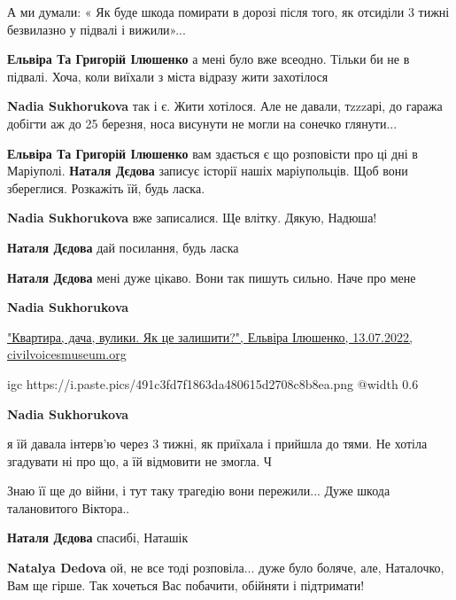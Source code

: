 
А ми думали: « Як буде шкода помирати в дорозі після того, як отсиділи 3 тижні
безвилазно у підвалі і вижили»...

\begin{itemize} %
\textbf{Ельвіра Та Григорій Ілюшенко} а мені було вже всеодно. Тільки би не в підвалі. Хоча, коли виїхали з міста відразу жити захотілося

\textbf{Nadia Sukhorukova} так і є. Жити хотілося. Але не давали, тzzzарі, до гаража добігти аж до 25 березня, носа висунути не могли на сонечко глянути...

\textbf{Ельвіра Та Григорій Ілюшенко} вам здається є що розповісти про ці дні в Маріуполі. \textbf{Наталя Дєдова} записує історії нашіх маріупольців. Щоб вони збереглися. Розкажіть їй, будь ласка.

\textbf{Nadia Sukhorukova} вже записалися. Ще влітку. Дякую, Надюша!

\textbf{Наталя Дєдова} дай посилання, будь ласка

\textbf{Наталя Дєдова} мені дуже цікаво. Вони так пишуть сильно. Наче про мене

\textbf{Nadia Sukhorukova}

\href{https://civilvoicesmuseum.org/stories/%22kvartira-dacha-uliki.-kak-eto-brosit%22}{%
"Квартира, дача, вулики. Як це залишити?", Ельвіра Ілюшенко, 13.07.2022, civilvoicesmuseum.org%
}

\ifcmt
  igc https://i.paste.pics/491c3fd7f1863da480615d2708c8b8ea.png
	@width 0.6
\fi

\textbf{Nadia Sukhorukova} 

я їй давала інтерв'ю через 3 тижні, як приїхала і прийшла до тями. Не хотіла
згадувати ні про що, а їй відмовити не змогла. Ч

Знаю її ще до війни, і тут таку трагедію вони пережили... Дуже шкода талановитого
Віктора..

\textbf{Наталя Дєдова} спасибі, Наташік

\textbf{Natalya Dedova} ой, не все тоді розповіла... дуже було боляче, але, Наталочко, Вам ще гірше. Так хочеться Вас побачити, обійняти і підтримати!

\end{itemize} %

